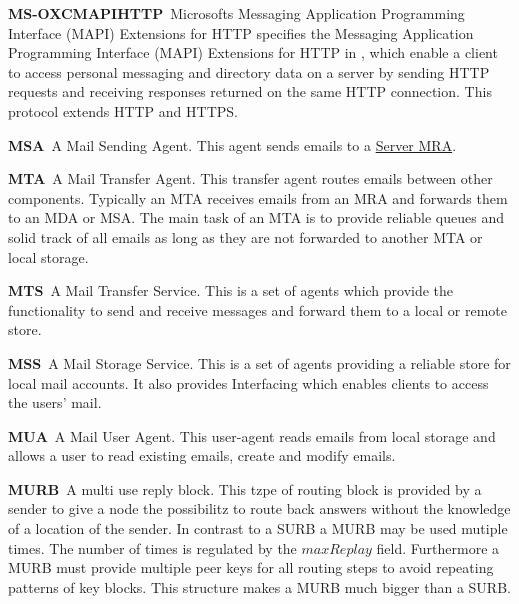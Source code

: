 \documentclass[a4paper,appendixprefix,pdfusetitle,twocolumn,fontsize=8pt,DIV=calc,8pt,draft]{\doctype} %
\newenvironment{entry}{\par\leavevmode\hangpara{1.5mm}{1}\ignorespaces}{\RaggedRight\par}
\newcommand*{\mainentry}[2]{{\bfseries{#1\label{def:#1}}}~#2\par}
\newcommand*{\defref}[1]{\hyperref[def:#1]{#1}}
\begin{document}
\begin{entry}
	\mainentry{MS-OXCMAPIHTTP}{Microsofts Messaging Application Programming Interface (MAPI) 
		Extensions for HTTP specifies the Messaging Application Programming Interface (MAPI) Extensions for HTTP in \cite{ms-oxcmapihttp}, which enable a client to access personal messaging and directory data on a server by sending HTTP requests and receiving responses returned on the same HTTP connection. This protocol extends HTTP and HTTPS.}
\end{entry}

\begin{entry}
	\mainentry{MSA}{A Mail Sending Agent. This agent sends emails to a \defref{Server MRA}. }
\end{entry}

\begin{entry}
	\mainentry{MTA}{A Mail Transfer Agent. This transfer agent routes emails between other components. Typically an MTA receives emails from an MRA and forwards them to an MDA or MSA. The main task of an MTA is to provide reliable queues and solid track of all emails as long as they are not forwarded to another MTA or local storage.}
\end{entry}

\begin{entry}
	\mainentry{MTS}{A Mail Transfer Service. This is a set of agents which provide the functionality to send and receive messages and forward them to a local or remote store.}
\end{entry}

\begin{entry}
	\mainentry{MSS}{A Mail Storage Service. This is a set of agents providing a reliable store for local mail accounts. It also provides Interfacing which enables clients to access the users' mail.}
\end{entry}

\begin{entry}
	\mainentry{MUA}{A Mail User Agent. This user-agent reads emails from local storage and allows a user to read existing emails, create and modify emails.}
\end{entry}

\begin{entry}
	\mainentry{MURB}{A multi use reply block. This tzpe of routing block is provided by a sender to give a node the possibilitz to route back answers without the knowledge of a location of the sender. In contrast to a SURB a MURB may be used mutiple times. The number of times is regulated by the $maxReplay$ field. Furthermore a MURB must provide multiple peer keys for all routing steps to avoid repeating patterns of key blocks. This structure makes a MURB much bigger than a SURB.}
\end{entry}
\end{document}
